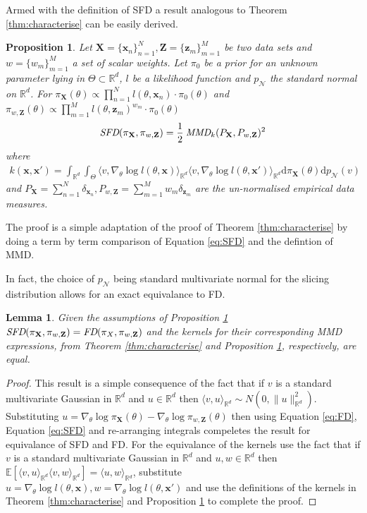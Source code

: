 \documentclass[hyperref]{article}
\theoremstyle{plain}
\newtheorem{proposition}[theorem]{Proposition}
\newtheorem{lemma}[theorem]{Lemma}
\theoremstyle{remark}
\newcommand{\bx}{\mathbf{x}}
\newcommand{\bz}{\mathbf{z}}
\newcommand{\bX}{\mathbf{X}}
\newcommand{\bZ}{\mathbf{Z}}
\newcommand{\bbR}{\mathbb{R}}
\newcommand{\bbE}{\mathbb{E}}
\begin{document}
Armed with the definition of SFD a result analogous to Theorem \ref{thm:characterise} can be easily derived.

\begin{proposition}\label{prop:SFD_MMD}
	Let $\bX = \{\bx_{n}\}_{n=1}^{N}, \bZ = \{\bz_{m}\}_{m=1}^{M}$ be two data sets and $w = \{w_{m}\}_{m=1}^{M}$ a set of scalar weights. Let $\pi_{0}$ be a prior for an unknown parameter lying in $\Theta \subset \bbR^{d}$, $l$ be a likelihood function and $p_{\mathcal{N}}$ the standard normal on $\bbR^{d}$. For  ${\pi_{\bX}(\theta)\propto\prod_{n=1}^{N}l(\theta,\bx_{n})\cdot\pi_{0}(\theta)}$ and ${\pi_{w,\bZ}(\theta)\propto\prod_{m=1}^{M}l(\theta,\bz_{m})^{w_{m}}\cdot\pi_{0}(\theta)}$  
	\begin{align*}
		\emph{SFD}(\pi_{\bX},\pi_{w,\bZ}) = \frac{1}{2}\:\emph{MMD}_{k}(P_{\bX}, P_{w,\bZ})^{2} 
	\end{align*}
	where 
	\begin{align*}
		k(\bx,\bx') = \int_{\bbR^{d}}\int_{\Theta}\langle v,\nabla_{\theta}\log l(\theta,\bx)\rangle_{\bbR^{d}}\langle v,\nabla_{\theta}\log l(\theta,\bx')\rangle_{\bbR^{d}} \mathrm{d}\pi_{\bX}(\theta)\mathrm{d}p_{\mathcal{N}}(v)
	\end{align*}
	and $P_{\bX} = \sum_{n=1}^{N}\delta_{\bx_{n}}, P_{w,\bZ} = \sum_{m=1}^{M}w_{m}\delta_{\bz_{m}}$ are the un-normalised empirical data measures.
\end{proposition}
The proof is a simple adaptation of the proof of Theorem \ref{thm:characterise} by doing a term by term comparison of Equation \ref{eq:SFD} and the defintion of MMD.

In fact, the choice of $p_{\mathcal{N}}$ being standard multivariate normal for the slicing distribution allows for an exact equivalance to FD. 

\begin{lemma}\label{lem:SFD_FD}
	Given the assumptions of Proposition \ref{prop:SFD_MMD} $\emph{SFD}(\pi_{\bX},\pi_{w,\bZ}) = \emph{FD}(\pi_{X},\pi_{w,\bZ})$ and the kernels for their corresponding MMD expressions, from Theorem \ref{thm:characterise} and Proposition \ref{prop:SFD_MMD}, respectively, are equal.
\end{lemma}
\begin{proof}
	This result is a simple consequence of the fact that if $v$ is a standard multivariate Gaussian in $\bbR^{d}$ and $u\in\bbR^{d}$ then $\langle v,u\rangle_{\bbR^{d}}\sim N(0,\lVert u\rVert_{\bbR^{d}}^{2})$. Substituting $u = \nabla_{\theta}\log\pi_{\bX}(\theta) - \nabla_{\theta}\log\pi_{w,\bZ}(\theta)$ then using Equation \eqref{eq:FD}, Equation \eqref{eq:SFD} and re-arranging integrals compeletes the result for equivalance of SFD and FD. For the equivalance of the kernels use the fact that if $v$ is a standard multivariate Gaussian in $\bbR^{d}$ and $u,w\in\bbR^{d}$ then $\bbE[\langle v,u\rangle_{\bbR^{d}}\langle v,w\rangle_{\bbR^{d}}] = \langle u,w\rangle_{\bbR{^d}}$, substitute $u = \nabla_{\theta}\log l(\theta,\bx), w = \nabla_{\theta}\log l(\theta,\bx')$ and use the definitions of the kernels in Theorem \ref{thm:characterise} and Proposition \ref{prop:SFD_MMD} to complete the proof. 
\end{proof}
\end{document}
